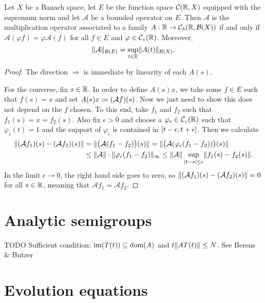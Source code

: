 \begin{proposition}
Let $X$ be a Banach space, let $E$ be the function space $\operatorname{\mathcal{C}}(\mathbb{R},X)$ equipped with the supremum norm and let $\mathcal{A}$ be a bounded operator on $E$. Then $\mathcal{A}$ is the multiplication operator associated to a family $A: \mathbb{R}\to \operatorname{\mathcal{C}}_b(\mathbb{R}, \operatorname{\mathcal{B}}(X))$ \textup{if and only if} $\mathcal{A}(\varphi f) = \varphi\mathcal{A}(f)$ for all $f\in E$ and $\varphi\in\operatorname{\mathcal{C}}_c(\mathbb{R})$. Moreover,
\[ \lVert\mathcal{A}\rVert_{\operatorname{\mathcal{B}}(E)} = \sup_{t\in\mathbb{R}}\lVert A(t)\rVert_{\operatorname{\mathcal{B}}(X)}. \]
\end{proposition}
\begin{proof}
The direction $\Rightarrow$ is immediate by linearity of each $A(s)$.

For the converse, fix $s\in \mathbb{R}$. In order to define $A(s)x$, we take some $f\in E$ such that $f(s) = x$ and set $A(s)x \coloneqq (\mathcal{A}f)(s)$. Now we just need to show this does not depend on the $f$ chosen. To this end, take $f_1$ and $f_2$ such that $f_1(s) = x = f_2(s)$. Also fix $\epsilon >0$ and choose a $\varphi_\epsilon\in\operatorname{\mathcal{C}}_c(\mathbb{R})$ such that $\varphi_\epsilon(t) = 1$ and the support of $\varphi_\epsilon$ is contained in $\interval{t-\epsilon, t+\epsilon}$. Then we calculate
\begin{align*}
\lVert(\mathcal{A}f_1)(s) - (\mathcal{A}f_2)(s)\rVert &= \lVert\big(\mathcal{A}(f_1 - f_2)\big)(s)\rVert = \lVert\big(\mathcal{A}(\varphi_\epsilon (f_1 - f_2))\big)(s)\rVert \\
&\leq \lVert\mathcal{A}\rVert\cdot\lVert\varphi_\epsilon (f_1-f_2)\rVert_\infty \leq \lVert\mathcal{A}\rVert \sup_{|t-s|\leq \epsilon}\lVert f_1(s)-f_2(s)\rVert.
\end{align*}
In the limit $\epsilon\to 0$, the right hand side goes to zero, so $\lVert(\mathcal{A}f_1)(s) - (\mathcal{A}f_2)(s)\rVert = 0$ for all $s\in \mathbb{R}$, meaning that $\mathcal{A}f_1 = \mathcal{A}f_2$.
\end{proof}

\chapter{Analytic semigroups}

TODO Sufficient condition: $\operatorname{im}(T(t)) \subseteq \operatorname{dom}(A)$ and $t\lVert AT(t)\rVert \leq N$. See Berens \& Butzer

\chapter{Evolution equations}
